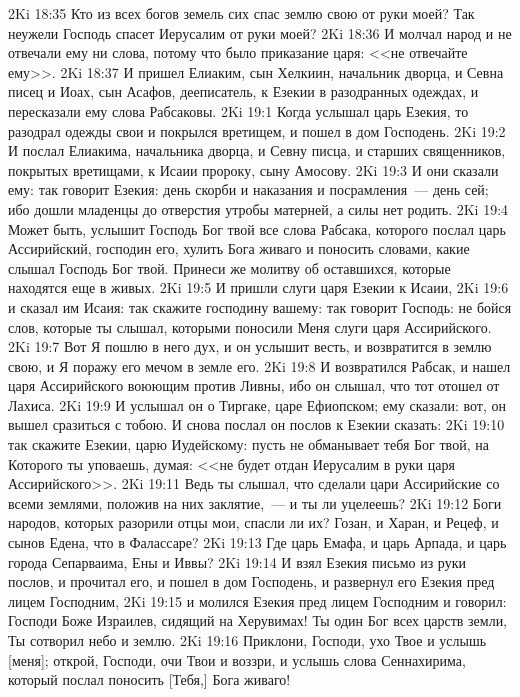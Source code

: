 \vs 2Ki 18:35 Кто из всех богов земель сих спас землю свою от руки моей? Так неужели Господь спасет Иерусалим от руки моей?
\vs 2Ki 18:36 И молчал народ и не отвечали ему ни слова, потому что было приказание царя: <<не отвечайте ему>>.
\vs 2Ki 18:37 И пришел Елиаким, сын Хелкиин, начальник дворца, и Севна писец и Иоах, сын Асафов, дееписатель, к Езекии в разодранных одеждах, и пересказали ему слова Рабсаковы.
\vs 2Ki 19:1 Когда услышал  царь Езекия, то разодрал одежды свои и покрылся вретищем, и пошел в дом Господень.
\vs 2Ki 19:2 И послал Елиакима, начальника дворца, и Севну писца, и старших священников, покрытых вретищами, к Исаии пророку, сыну Амосову.
\vs 2Ki 19:3 И они сказали ему: так говорит Езекия: день скорби и наказания и посрамления~--- день сей; ибо дошли младенцы до отверстия утробы матерней, а силы нет родить.
\vs 2Ki 19:4 Может быть, услышит Господь Бог твой все слова Рабсака, которого послал царь Ассирийский, господин его, хулить Бога живаго и поносить словами, какие слышал Господь Бог твой. Принеси же молитву об оставшихся, которые находятся еще в живых.
\vs 2Ki 19:5 И пришли слуги царя Езекии к Исаии,
\vs 2Ki 19:6 и сказал им Исаия: так скажите господину вашему: так говорит Господь: не бойся слов, которые ты слышал, которыми поносили Меня слуги царя Ассирийского.
\vs 2Ki 19:7 Вот Я пошлю в него дух, и он услышит весть, и возвратится в землю свою, и Я поражу его мечом в земле его.
\rsbpar\vs 2Ki 19:8 И возвратился Рабсак, и нашел царя Ассирийского воюющим против Ливны, ибо он слышал, что тот отошел от Лахиса.
\vs 2Ki 19:9 И услышал он о Тиргаке, царе Ефиопском; ему сказали: вот, он вышел сразиться с тобою. И снова послал он послов к Езекии сказать:
\vs 2Ki 19:10 так скажите Езекии, царю Иудейскому: пусть не обманывает тебя Бог твой, на Которого ты уповаешь, думая: <<не будет отдан Иерусалим в руки царя Ассирийского>>.
\vs 2Ki 19:11 Ведь ты слышал, что сделали цари Ассирийские со всеми землями, положив на них заклятие,~--- и ты ли уцелеешь?
\vs 2Ki 19:12 Боги народов, которых разорили отцы мои, спасли ли их?  Гозан, и Харан, и Рецеф, и сынов Едена, что в Фалассаре?
\vs 2Ki 19:13 Где царь Емафа, и царь Арпада, и царь города Сепарваима, Ены и Иввы?
\vs 2Ki 19:14 И взял Езекия письмо из руки послов, и прочитал его, и пошел в дом Господень, и развернул его Езекия пред лицем Господним,
\vs 2Ki 19:15 и молился Езекия пред лицем Господним и говорил: Господи Боже Израилев, сидящий на Херувимах! Ты один Бог всех царств земли, Ты сотворил небо и землю.
\vs 2Ki 19:16 Приклони, Господи, ухо Твое и услышь [меня]; открой, Господи, очи Твои и воззри, и услышь слова Сеннахирима, который послал поносить [Тебя,] Бога живаго!
